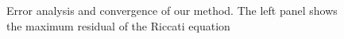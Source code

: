 \documentclass[10pt]{article}
\begin{document}
\begin{figure}[tb]
    \flushleft
    \caption{\label{convergence-plot} Error analysis and convergence of our
    method. The left panel shows the maximum residual of the Riccati equation
}
\end{figure}
\end{document}
